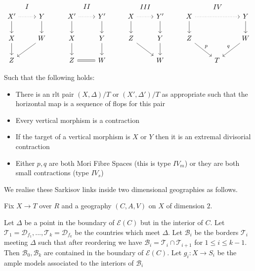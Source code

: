 \[\begin{tikzcd}
X' \arrow[d] \arrow[r, dotted] \arrow[r, "I", phantom, bend left=49] & Y \arrow[d]  & X' \arrow[r, dotted] \arrow[d] \arrow[r, "II",phantom, bend left=49] & Y' \arrow[d] & X \arrow[r, dotted] \arrow[d] \arrow[r, "III", phantom, bend left=49] & Y' \arrow[d] & X \arrow[d] \arrow[rr, dotted] \arrow[rr, "IV",phantom, bend left] &   & Y \arrow[d]       \\
X \arrow[d]                                                          & W \arrow[ld] & X \arrow[d]                                               & Y \arrow[d]  & Z \arrow[rd]                                              & Y \arrow[d]  & Z \arrow[rd, "p"]                                          &   & W \arrow[ld, "q"'] \\
Z                                                                    &              & Z \arrow[r, equal]                                                         & W            &                                                           & W            &                                                            & T &                  
\end{tikzcd} \]


Such that the following holds:
\begin{itemize}
	\item There is an rlt pair $(X,\Delta)/T$ or $(X',\Delta')/T$ as appropriate such that the horizontal map is a sequence of flops for this pair
	\item Every vertical morphism is a contraction
	\item If the target of a vertical morphism is $X$ or $Y$ then it is an extremal divisorial contraction
	\item Either $p,q$ are both Mori Fibre Spaces (this is type $IV_{m}$) or they are both small contractions (type $IV_{s}$)
\end{itemize}

We realise these Sarkisov links inside two dimensional geographies as follows.

Fix $X\to T$ over $R$ and a geography $(C,A,V)$ on $X$ of dimension $2$.

Let $\Delta$ be a point in the boundary of $\mathcal{E}(C)$ but in the interior of $C$. Let $\mathcal{T}_{1}=\mathcal{D}_{f_{1}},..., \mathcal{T}_{k}=\mathcal{D}_{f_{k}}$ be the countries which meet $\Delta$. Let $\mathcal{B}_{i}$ be the borders $\mathcal{T}_{i}$ meeting $\Delta$ such that after reordering we have $\mathcal{B}_{i}=\mathcal{T}_{i}\cap \mathcal{T}_{i+1}$ for $1 \leq i \leq k-1$. Then $\mathcal{B}_{0}, \mathcal{B}_{k}$ are contained in the boundary of $\mathcal{E}(C)$. Let $g_{i}:X \to S_{i}$ be the ample models associated to the interiors of $\mathcal{B}_{i}$

